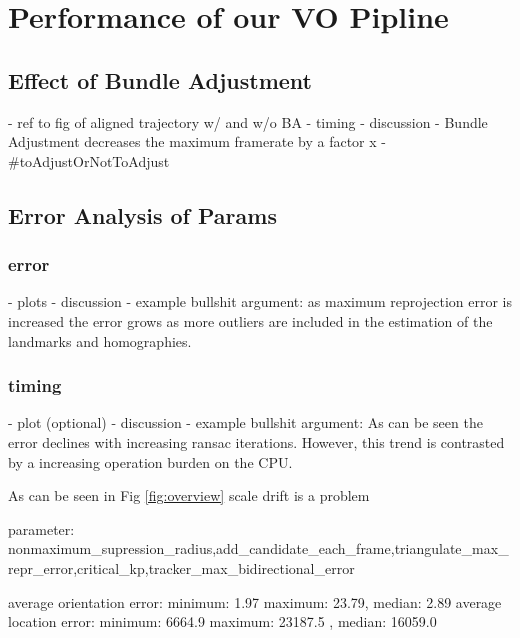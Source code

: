\chapter{Performance of our VO Pipline}
\label{performance}

\section{Effect of Bundle Adjustment}
- ref to fig of aligned trajectory w/ and w/o BA
- timing 
- discussion
- Bundle Adjustment decreases the maximum framerate by a factor x
- #toAdjustOrNotToAdjust

\section{Error Analysis of Params}

\subsection{error}
- plots
- discussion
- example bullshit argument: as maximum reprojection error is increased the error grows as more outliers are included in the estimation of the landmarks and homographies.

\subsection{timing}
- plot (optional)
- discussion
- example bullshit argument: As can be seen the error declines with increasing ransac iterations. However, this trend is contrasted by a increasing operation burden on the CPU.






As can be seen in Fig \ref{fig:overview} scale drift is a problem

parameter:  nonmaximum\_supression\_radius,add\_candidate\_each\_frame,triangulate\_max\_repr\_error,critical\_kp,tracker\_max\_bidirectional\_error

average orientation error: minimum: 1.97 maximum: 23.79, median: 2.89
average location error: minimum: 6664.9 maximum: 23187.5 , median: 16059.0